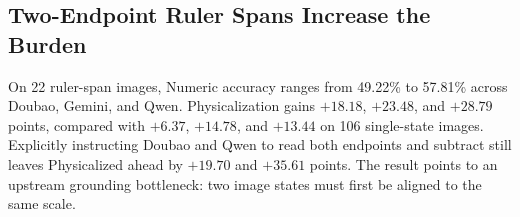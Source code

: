 \subsection{Two-Endpoint Ruler Spans Increase the Burden}

On 22 ruler-span images, Numeric accuracy ranges from 49.22\% to 57.81\% across Doubao, Gemini, and Qwen. Physicalization gains $+18.18$, $+23.48$, and $+28.79$ points, compared with $+6.37$, $+14.78$, and $+13.44$ on 106 single-state images. Explicitly instructing Doubao and Qwen to read both endpoints and subtract still leaves Physicalized ahead by $+19.70$ and $+35.61$ points. The result points to an upstream grounding bottleneck: two image states must first be aligned to the same scale.
